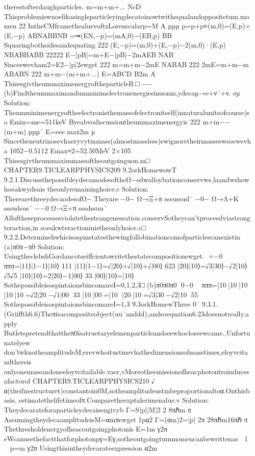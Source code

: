 {{{{{{{{{{{therestofterdaughparticles.
m=m+m+...
NcD
Thisproblemiswnoelikasingleparticleyingdecatoinowtwithequalandoppositetum.momen
22
IntheCMframethealuevoftzLorenscalarp=M
A
µµµ
p=p+p≡(m,0)=(E,p)+(E,−p)
ABNABBNB
=⇒(EN,−p)=(mA,0)−(EB,p)
BB
Squaringbothsidesandequating
222
(E,−p)=(m,0)+(E,−p)−2(m,0)·(E,p)
NBABBABB
22222
E−|pB|=m+E−|pB|−2mAEB
NAB
Sinceewevham2=E2−|p|2ewget
222
m=m+m−2mE
NABAB
222
2mE=m+m−m
ABABN
222
m+m−(m+m+...)
E=ABCD
B2m
A
ThisesgivtheummaximenergyoftheparticleB.□
−−
(b)Findtheummaximandumminimelectronenergiesinuonm,ydecaµ→e+ν¯+ν.
eµ
Solution:
Theumminimenergyoftheelectronisthemassofelectronitself(innaturalunitsofcourse)so
Emin=me=511keV
Byeabvodiscussiontheummaximenergyis
222
m+m−−(m+m)
µµµ¯
E=eee
max2m
µ
Sincetheneutrinosevhaeryvytinmass(almostmassless)ewignoretheirmasseswsoewevha
1052−0.5112
Emax≈2=52.50MeV
2×105
Thisesgivtheummaximmassoftheoutgoinguon.m□
CHAPTER9.TICLEARPPHYSICS209
9.2orkHomewowT
9.2.1.DiscussthepossibleydecamodesoftheΩ−edwalloybationconservws,laandwshowhoeakwydeais
theonlyremaininghoice.c
Solution:
TherearethreeydecaodesofΩ−.Theyare
−0−
Ω→Ξ+π
sssussud¯
−0−
Ω→Λ+K
sssudsus¯
−−0
Ω→Ξ+π
sssdssuu¯
Alloftheseprocessesviolatethestrangenessation.conservSotheycan’tproceedviastrongteraction,in
soeakwteractioninistheonlyhoice.c□
9.2.2.Determinehwhicisospinstatesthewingfollobinationcomofparticlescanexistin
(a)π0π−π0
Solution:
UsingtheclebshGordancotseiffcientowritethestatecompositionewget.
+−0⟩

πππ=|11⟩|1−1⟩|10⟩
111
|11⟩|1−1⟩=√|20⟩+√|10⟩+√|00⟩
623
|20⟩|10⟩=√3|30⟩−√2|10⟩
√5√5
|10⟩|10⟩=2|20⟩−1|00⟩
33
|00⟩|10⟩=|10⟩
SothepossibleisospintaionsbincomareI={0,1,2,3}□
(b)π0π0π0
0−0⟩

πππ=|10⟩|10⟩|10⟩
|10⟩|10⟩=√2|20⟩−√1|00⟩
33
|10⟩|00⟩=|10⟩
|20⟩|10⟩=√3|30⟩−√2|10⟩
55
SothepossibleisospintaionsbincomareI={1,3}
9.3orkHomewThree
0¯
9.3.1.(Griiffth6.6)Theπisacompositeobject(uu¯anddd),andsoequation6.23doesnotreally.apply
Butletspretendthattheπ0isatruetaryelemenparticleandseewhocloseewcame.,Unfortunatelyew
don’twknotheamplitudeM;erevwhoitustmevhathedimensionsofmasstimes,eloyvcitandthereis
onlyonemassandoneeloyvcitailable.vaer,vMoreotheemissionofheacphotontroinducesafactorof
CHAPTER9.TICLEARPPHYSICS210
√
α(theifnestructuret)constantoin0M,sotheamplitudeustmbeproportionaltoα.Onthisbasis,
estimatethelifetimeofπ.Comparetheexptalerimenalue.v
Solution:
Theydecarateforaparticleydecaisengivyb
Γ=S|p||M|2
2
8πℏm
π
AssumingtheydecaamplitudeisM=αmπewget
1pα2
Γ=(αm)2=|p|
2π
28πℏm16πℏ
π
Thethresholdenergyofheacoutgoingphotonis
E=1m
γ2π


eWcanusethefactthatforphotonpγ=Eγ,sotheoutgoingtummomencanbewrittenas
1

p=m
γ2π
Usingthisintheydecarateexpression
α2m
}}}}}}}}}}}
